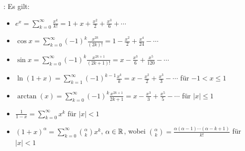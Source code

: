 \Satz {}: Es gilt:
\vspace{-0.6em}
\begin{itemize}
    \item $e^x = \sum_{k=0}^{\infty} \frac{x^{k}}{k!} = 1 + x + \frac{x^2}{2} + \frac{x^3}{6} + \cdots$
    \item $\cos x = \sum_{k=0}^{\infty} (-1)^k \frac{x^{2k}}{(2k)!} = 1 - \frac{x^2}{2} + \frac{x^4}{24} - \cdots$
    \item $\sin x = \sum_{k=0}^{\infty} (-1)^k \frac{x^{2k + 1}}{(2k+1)!} = x - \frac{x^3}{6} + \frac{x^5}{120} - \cdots$
    \item $\ln (1 + x) = \sum_{k=1}^{\infty} (-1)^{k-1} \frac{x^k}{k} = x - \frac{x^2}{2} + \frac{x^3}{3} - \cdots$ für $-1 < x \le 1$
    \item $\arctan(x) = \sum_{k=0}^{\infty} (-1)^k \frac{x^{2k+1}}{2k+1} = x - \frac{x^3}{3} + \frac{x^5}{5} - \cdots$ für $|x| \le 1$
    \item $\frac{1}{1-x} = \sum_{k=0}^{\infty} x^k$ für $|x| < 1$
    \item $(1 + x)^\alpha = \sum_{k=0}^{\infty} \binom{\alpha}{k} x^k$, $\alpha \in \mathbb{R}$, wobei $\binom{\alpha}{k} = \frac{\alpha(\alpha-1)\cdots(\alpha-k+1)}{k!}$ für $|x| < 1$
\end{itemize}
